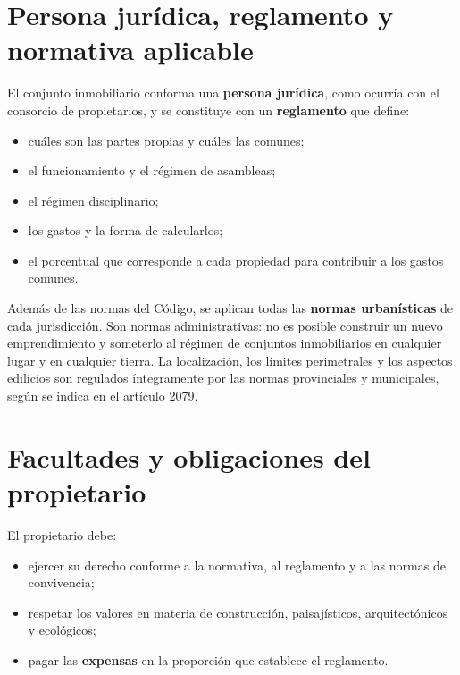 \documentclass[12pt,oneside]{book}
\begin{document}
\section{Persona jurídica, reglamento y normativa aplicable}

El conjunto inmobiliario conforma una \textbf{persona jurídica}, como ocurría con el consorcio de propietarios, y se constituye con un \textbf{reglamento} que define:

\begin{itemize}
    \item cuáles son las partes propias y cuáles las comunes;
    \item el funcionamiento y el régimen de asambleas;
    \item el régimen disciplinario;
    \item los gastos y la forma de calcularlos;
    \item el porcentual que corresponde a cada propiedad para contribuir a los gastos comunes.
\end{itemize}

Además de las normas del Código, se aplican todas las \textbf{normas urbanísticas} de cada jurisdicción. Son normas administrativas: no es posible construir un nuevo emprendimiento y someterlo al régimen de conjuntos inmobiliarios en cualquier lugar y en cualquier tierra. La localización, los límites perimetrales y los aspectos edilicios son regulados íntegramente por las normas provinciales y municipales, según se indica en el artículo 2079.

\section{Facultades y obligaciones del propietario}

El propietario debe:

\begin{itemize}
    \item ejercer su derecho conforme a la normativa, al reglamento y a las normas de convivencia;
    \item respetar los valores en materia de construcción, paisajísticos, arquitectónicos y ecológicos;
    \item pagar las \textbf{expensas} en la proporción que establece el reglamento.
\end{itemize}
\end{document}

